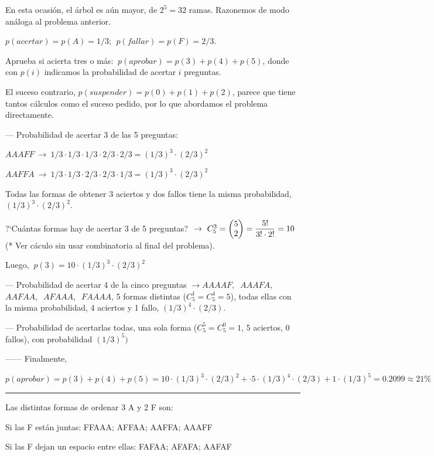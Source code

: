 En esta ocasión, el árbol es aún mayor, de $2^5=32$ ramas. Razonemos de modo análoga al problema anterior.

$p(acertar)=p(A)=1/3; \ \ p(fallar)=p(F)=2/3$.

Aprueba si acierta tres o más: $\ p(aprobar)=p(3)+p(4)+p(5)$, donde con $p(i)$ indicamos la probabilidad de acertar $i$ preguntas.

\textcolor{gris}{El suceso contrario, $p(suspender)=p(0)+p(1)+p(2)$, parece que tiene tantos cálculos como el suceso pedido, por lo que abordamos el problema directamente.}

--- Probabilidad de acertar 3 de las 5 preguntas:

$AAAFF \ \to \ 1/3\cdot 1/3 \cdot 1/3 \cdot 2/3 \cdot 2/3=(1/3)^3\cdot (2/3)^2$

$AAFFA \ \to \ 1/3\cdot 1/3 \cdot 2/3 \cdot 2/3 \cdot 1/3=(1/3)^3\cdot (2/3)^2$

Todas las formas de obtener 3 aciertos y dos fallos tiene la misma probabilidad, $(1/3)^3\cdot (2/3)^2$.

?`Cuántas formas hay de acertar 3 de 5 preguntas? $\ \to \ C_{5}^3=\mqty(5\\2)=\dfrac{5!}{3!\cdot 2!}=10$ \textcolor{gris}{(* Ver cáculo sin usar combinatoria al final del problema)}.

Luego, $\ p(3)=10\cdot (1/3)^3\cdot (2/3)^2$

--- Probabilidad de acertar 4 de la cinco preguntas $\to AAAAF,\ $ $AAAFA,\ $ $AAFAA,\ $ $AFAAA,\ $ $FAAAA$, 5 formas distintas ($C_5^1=C_5^4=5$), todas ellas con la misma probabilidad, 4 aciertos y 1 fallo, $(1/3)^4\cdot (2/3)$.

--- Probabilidad de acertarlas todas, una sola forma ($C_5^5=C_5^0=1$, 5 aciertos, 0 fallos), con probabilidad $(1/3)^5)$

------ Finalmente,

$p(aprobar)=p(3)+p(4)+p(5)=10 \cdot (1/3)^3 \cdot (2/3)^2+ \cdot 5 \cdot (1/3)^4 \cdot (2/3) + 1 \cdot (1/3)^5=0.2099\approx 21\%$

\vspace{1cm} 

\textcolor{gris}{\rule{100mm}{0.1mm}}

\textcolor{gris}{Las distintas formas de ordenar 3 A y 2 F son:}

\textcolor{gris}{Si las F están juntas: FFAAA; AFFAA; AAFFA; AAAFF}

\textcolor{gris}{Si las F dejan un espacio entre ellas: FAFAA; AFAFA; AAFAF}

